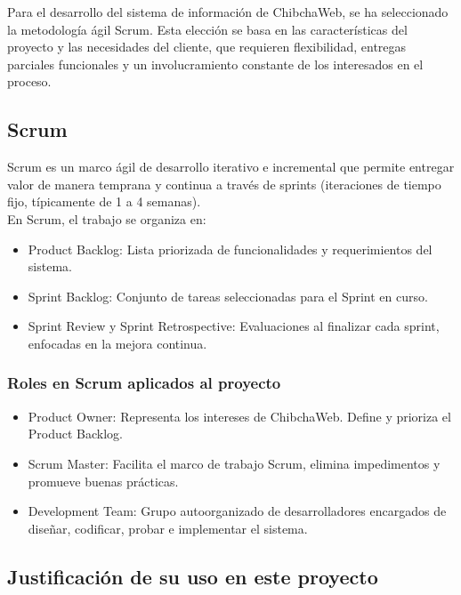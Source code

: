 Para el desarrollo del sistema de información de ChibchaWeb, se ha seleccionado la metodología ágil Scrum. Esta elección se basa en las características del proyecto y las necesidades del cliente, que requieren flexibilidad, entregas parciales funcionales y un involucramiento constante de los interesados en el proceso.

\subsection{Scrum}
Scrum es un marco ágil de desarrollo iterativo e incremental que permite entregar valor de manera temprana y continua a través de sprints (iteraciones de tiempo fijo, típicamente de 1 a 4 semanas).\\
En Scrum, el trabajo se organiza en:

\begin{itemize}
    \item {Product Backlog: Lista priorizada de funcionalidades y requerimientos del sistema.}
    \item {Sprint Backlog: Conjunto de tareas seleccionadas para el Sprint en curso.}
    \item {Sprint Review y Sprint Retrospective: Evaluaciones al finalizar cada sprint, enfocadas en la mejora continua.}
\end{itemize}

\subsubsection{Roles en Scrum aplicados al proyecto}

\begin{itemize}
    \item {Product Owner: Representa los intereses de ChibchaWeb. Define y prioriza el Product Backlog.}
    \item {Scrum Master: Facilita el marco de trabajo Scrum, elimina impedimentos y promueve buenas prácticas.}
    \item {Development Team: Grupo autoorganizado de desarrolladores encargados de diseñar, codificar, probar e implementar el sistema.}
\end{itemize}

\subsection{Justificación de su uso en este proyecto}

